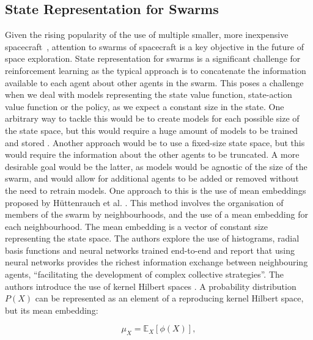 \subsection{State Representation for Swarms}\label{ssec:state:swarm}

Given the rising popularity of the use of multiple smaller, more inexpensive spacecraft~\cite{Wells2006, Laurin2008, Scott2013, Yu2014}, attention to swarms of spacecraft is a key objective in the future of space exploration. State representation for swarms is a significant challenge for reinforcement learning as the typical approach is to concatenate the information available to each agent about other agents in the swarm. This poses a challenge when we deal with models representing the state value function, state-action value function or the policy, as we expect a constant size in the state. One arbitrary way to tackle this would be to create models for each possible size of the state space, but this would require a huge amount of models to be trained and stored \cite{Lowe2017}. Another approach would be to use a fixed-size state space, but this would require the information about the other agents to be truncated. A more desirable goal would be the latter, as models would be agnostic of the size of the swarm, and would allow for additional agents to be added or removed without the need to retrain models. One approach to this is the use of mean embeddings proposed by Hüttenrauch et al. \cite{Huttenrauch2018}. This method involves the organisation of members of the swarm by neighbourhoods, and the use of a mean embedding for each neighbourhood. The mean embedding is a vector of constant size representing the state space. The authors explore the use of histograms, radial basis functions and neural networks trained end-to-end and report that using neural networks provides the richest information exchange between neighbouring agents, ``facilitating the development of complex collective strategies''. The authors introduce the use of kernel Hilbert spaces \cite{Smola2007, Sriperumbudur2009}. A probability distribution $P(X)$ can be represented as an element of a reproducing kernel Hilbert space, but its mean embedding:

\begin{equation}
\mu_X=\mathbb{E}_X[\phi(X)],
\end{equation}

